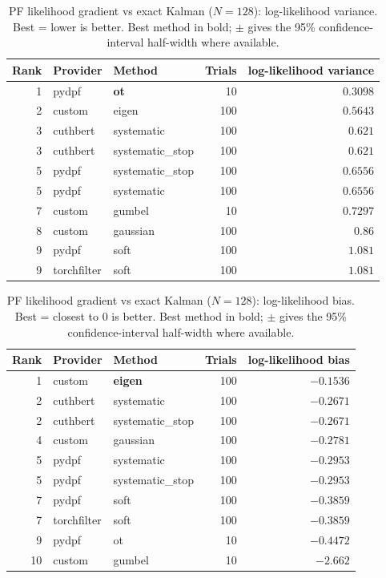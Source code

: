 \begin{table}[!htbp]
\centering
\small
\caption{PF likelihood gradient vs exact Kalman ($N=128$): log-likelihood variance. Best = lower is better. Best method in bold; $\pm$ gives the 95\% confidence-interval half-width where available.}
\label{tab:pf-likelihood-gradient-vs-exact-kalman-loglik-variance}
\begin{tabular}{rllrr}
\toprule
Rank & Provider & Method & Trials & log-likelihood variance \\
\midrule
1 & pydpf & \textbf{ot} & 10 & $\mathbf{0.3098}$ \\
2 & custom & eigen & 100 & $0.5643$ \\
3 & cuthbert & systematic & 100 & $0.621$ \\
3 & cuthbert & systematic\_stop & 100 & $0.621$ \\
5 & pydpf & systematic\_stop & 100 & $0.6556$ \\
5 & pydpf & systematic & 100 & $0.6556$ \\
7 & custom & gumbel & 10 & $0.7297$ \\
8 & custom & gaussian & 100 & $0.86$ \\
9 & pydpf & soft & 100 & $1.081$ \\
9 & torchfilter & soft & 100 & $1.081$ \\
\bottomrule
\end{tabular}
\end{table}

\begin{table}[!htbp]
\centering
\small
\caption{PF likelihood gradient vs exact Kalman ($N=128$): log-likelihood bias. Best = closest to 0 is better. Best method in bold; $\pm$ gives the 95\% confidence-interval half-width where available.}
\label{tab:pf-likelihood-gradient-vs-exact-kalman-loglik-bias}
\begin{tabular}{rllrr}
\toprule
Rank & Provider & Method & Trials & log-likelihood bias \\
\midrule
1 & custom & \textbf{eigen} & 100 & $\mathbf{-0.1536}$ \\
2 & cuthbert & systematic & 100 & $-0.2671$ \\
2 & cuthbert & systematic\_stop & 100 & $-0.2671$ \\
4 & custom & gaussian & 100 & $-0.2781$ \\
5 & pydpf & systematic & 100 & $-0.2953$ \\
5 & pydpf & systematic\_stop & 100 & $-0.2953$ \\
7 & pydpf & soft & 100 & $-0.3859$ \\
7 & torchfilter & soft & 100 & $-0.3859$ \\
9 & pydpf & ot & 10 & $-0.4472$ \\
10 & custom & gumbel & 10 & $-2.662$ \\
\bottomrule
\end{tabular}
\end{table}

